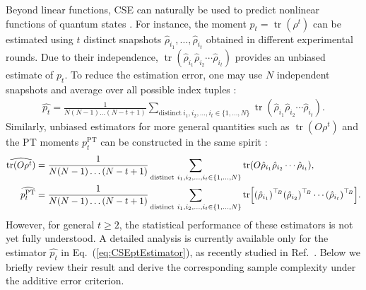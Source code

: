\documentclass[aps,prl,twocolumn,nofootinbib,superscriptaddress,10pt]{revtex4-2}
\let\originalleft\left
\let\originalright\right
\renewcommand{\left}{\mathopen{}\mathclose\bgroup\originalleft}
\renewcommand{\right}{\aftergroup\egroup\originalright}
\DeclareMathOperator{\Tr}{tr}
\theoremstyle{plain}
\theoremstyle{definition}
\newcommand{\PT}{\mathrm{PT}}
\def\eqref#1{\textup{(\ref{#1})}}
\begin{document}
Beyond linear functions, 
CSE can naturally be used to predict nonlinear functions of quantum states 
\cite{elben2020mixedstate,PhysRevLett.127.260501,HKPshadow20,elben2023randomized,PRXQuantum.4.010303,PhysRevX.14.031035}. 
For instance, the moment $p_t=\Tr(\rho^t)$ can be estimated using $t$ distinct snapshots 
$\hat\rho_{i_1},\dots,\hat\rho_{i_t}$ obtained in different experimental rounds. 
Due to their independence, $\Tr(\hat\rho_{i_1}\hat\rho_{i_2}\cdots\hat\rho_{i_t})$ provides an unbiased estimate of $p_t$. 
To reduce the estimation error, one may use $N$ independent snapshots and average over all possible index tuples \cite{pelecanos2026beating,elben2020mixedstate}:
\begin{align}\label{eq:CSEptEstimator}
\widehat{p_t} = \frac{1}{N(N-1)\dots(N-t+1)} \sum_{\text{distinct} \ i_1,i_2,\dots,i_t \in\{1,\dots,N\}} 
\Tr(\hat\rho_{i_1}\hat\rho_{i_2}\cdots\hat\rho_{i_t}). 
\end{align}
Similarly, unbiased estimators for more general quantities such as $\Tr(O\rho^t)$ and the PT moments $p_t^{\PT}$ can be constructed in the same spirit \cite{PRXQuantum.4.010303,elben2020mixedstate}:
\begin{align}
\widehat{\Tr(O\rho^t)} 
&= \frac{1}{N(N-1)\dots(N-t+1)} \sum_{\text{distinct} \ i_1,i_2,\dots,i_t \in\{1,\dots,N\}}  \Tr(O \hat\rho_{i_1} \hat\rho_{i_2}\cdots \hat\rho_{i_t}),
\label{eq:CSEptOEstimator}
\\
\widehat{p_t^{\PT}} 
&= \frac{1}{N(N-1)\dots(N-t+1)} \sum_{\text{distinct} \ i_1,i_2,\dots,i_t \in\{1,\dots,N\}} 
\Tr\left[ \left(\hat\rho_{i_1}\right)^{\top_{\! B}} \left(\hat\rho_{i_2}\right)^{\top_{\! B}} \cdots \left(\hat\rho_{i_t}\right)^{\top_{\! B}}\right].  
\label{eq:CSEPTMEstimator}
\end{align}
However, for general $t\ge2$, the statistical performance of these estimators is not yet fully understood. 
A detailed analysis is currently available only for the estimator $\widehat{p_t}$ in Eq.~\eqref{eq:CSEptEstimator}, as recently studied in Ref.~\cite{pelecanos2026beating}. 
Below we briefly review their result and derive the corresponding sample complexity under the additive error criterion.
\end{document}
